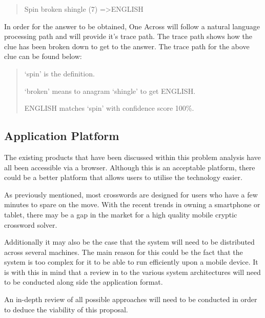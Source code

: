 \begin{quote}
Spin broken shingle (7) =\textgreater  ENGLISH
\end{quote}

In order for the answer to be obtained, One Across will follow a natural 
language processing path and will provide it's trace path. The trace path shows
how the clue has been broken down to get to the answer. The trace path for the 
above clue can be found below:

\begin{quote}
`spin' is the definition.

`broken' means to anagram `shingle' to get ENGLISH.

ENGLISH matches `spin' with confidence score 100\%.
\end{quote}


\subsection{Application Platform}

The existing products that have been discussed within this problem analysis 
have all been accessible via a browser. Although this is an acceptable 
platform, there could be a better platform that allows users to utilise the 
technology easier.

As previously mentioned, most crosswords are designed for users who have a few 
minutes to spare on the move. With the recent trends in owning a smartphone or 
tablet, there may be a gap in the market for a high quality mobile cryptic 
crossword solver.

Additionally it may also be the case that the system will need to be distributed
across several machines. The main reason for this could be the fact that the
system is too complex for it to be able to run efficiently upon a mobile device.
It is with this in mind that a review in to the various system architectures will need to be conducted along side the application format.

An in-depth review of all possible approaches will need to be conducted in order
to deduce the viability of this proposal.
